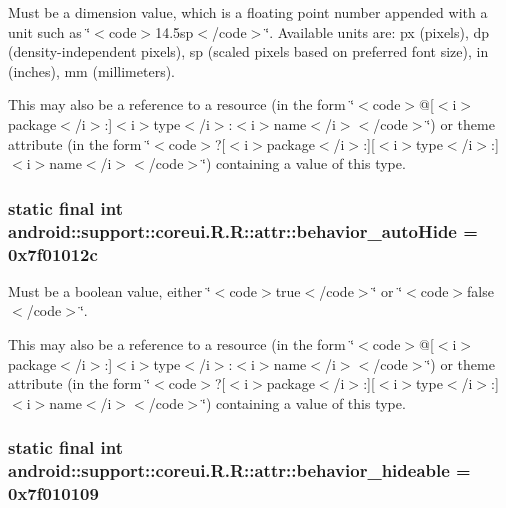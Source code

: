 Must be a dimension value, which is a floating point number appended with a unit such as \char`\"{}$<$code$>$14.5sp$<$/code$>$\char`\"{}. Available units are: px (pixels), dp (density-independent pixels), sp (scaled pixels based on preferred font size), in (inches), mm (millimeters). 

This may also be a reference to a resource (in the form \char`\"{}$<$code$>$@\mbox{[}$<$i$>$package$<$/i$>$:\mbox{]}$<$i$>$type$<$/i$>$:$<$i$>$name$<$/i$>$$<$/code$>$\char`\"{}) or theme attribute (in the form \char`\"{}$<$code$>$?\mbox{[}$<$i$>$package$<$/i$>$:\mbox{]}\mbox{[}$<$i$>$type$<$/i$>$:\mbox{]}$<$i$>$name$<$/i$>$$<$/code$>$\char`\"{}) containing a value of this type. \hypertarget{classandroid_1_1support_1_1coreui_1_1_r_1_1attr_ada130b5173e85f40c0e9bc7bef4103f}{
\subsubsection[{behavior\_\-autoHide}]{\setlength{\rightskip}{0pt plus 5cm}static final int android::support::coreui.R.R::attr::behavior\_\-autoHide = 0x7f01012c}}
\label{classandroid_1_1support_1_1coreui_1_1_r_1_1attr_ada130b5173e85f40c0e9bc7bef4103f}


Must be a boolean value, either \char`\"{}$<$code$>$true$<$/code$>$\char`\"{} or \char`\"{}$<$code$>$false$<$/code$>$\char`\"{}. 

This may also be a reference to a resource (in the form \char`\"{}$<$code$>$@\mbox{[}$<$i$>$package$<$/i$>$:\mbox{]}$<$i$>$type$<$/i$>$:$<$i$>$name$<$/i$>$$<$/code$>$\char`\"{}) or theme attribute (in the form \char`\"{}$<$code$>$?\mbox{[}$<$i$>$package$<$/i$>$:\mbox{]}\mbox{[}$<$i$>$type$<$/i$>$:\mbox{]}$<$i$>$name$<$/i$>$$<$/code$>$\char`\"{}) containing a value of this type. \hypertarget{classandroid_1_1support_1_1coreui_1_1_r_1_1attr_563c96c71df8389682746450748bea88}{
\subsubsection[{behavior\_\-hideable}]{\setlength{\rightskip}{0pt plus 5cm}static final int android::support::coreui.R.R::attr::behavior\_\-hideable = 0x7f010109}}
\label{classandroid_1_1support_1_1coreui_1_1_r_1_1attr_563c96c71df8389682746450748bea88}


